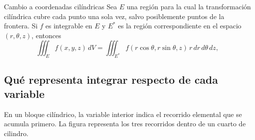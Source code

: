 \begin{mytheorem}{Cambio a coordenadas cilíndricas}
Sea $E$ una región para la cual la transformación cilíndrica cubre cada punto una sola vez, salvo posiblemente puntos de la frontera. Si $f$ es integrable en $E$ y $E^*$ es la región correspondiente en el espacio $(r,\theta,z)$, entonces
\[
\iiint_E f(x,y,z)\,dV
=\iiint_{E^*}f(r\cos\theta,r\sin\theta,z)\,r\,dr\,d\theta\,dz,
\]
\end{mytheorem}

\subsection{Qué representa integrar respecto de cada variable}

En un bloque cilíndrico, la variable interior indica el recorrido elemental que se acumula primero. La figura representa los tres recorridos dentro de un cuarto de cilindro.

